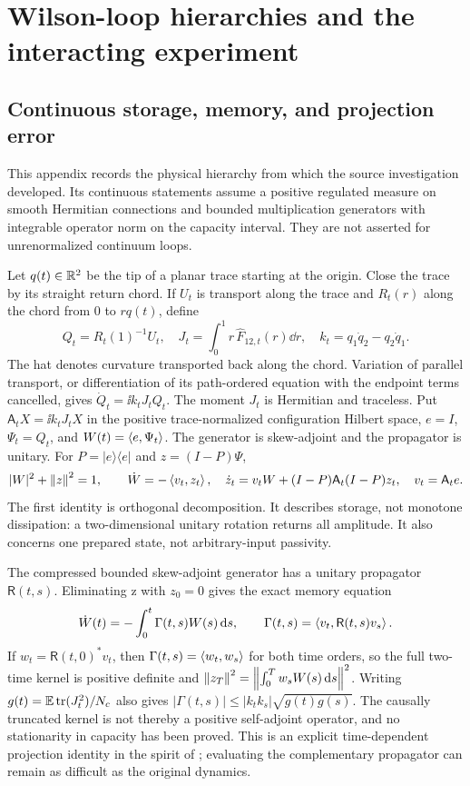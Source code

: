 \section{Wilson-loop hierarchies and the interacting experiment}\label{app:hierarchy}
\subsection{Continuous storage, memory, and projection error}
This appendix records the physical hierarchy from which the
source investigation developed. Its continuous statements
assume a positive regulated measure on smooth Hermitian
connections and bounded multiplication generators with
integrable operator norm on the capacity interval. They are
not asserted for unrenormalized continuum loops.

Let $q(t)\in\mathbb R^2$ be the tip of a planar trace starting at
the origin. Close the trace by its straight return chord.
If $U_t$ is transport along the trace and $R_t(r)$ along
the chord from 0 to $rq(t)$, define
\begin{equation}
Q_t=R_t(1)^{-1}U_t,\quad
J_t=\int_0^1r\,\widehat F_{12,t}(r)\dd r,\quad
k_t=q_1\dot q_2-q_2\dot q_1 .
\end{equation}
The hat denotes curvature transported back along the chord.
Variation of parallel transport, or differentiation of its
path-ordered equation with the endpoint terms cancelled,
gives $\dot Q_t=\ii k_tJ_tQ_t$. The moment $J_t$ is Hermitian
and traceless. Put $\mathsf A_tX=\ii k_tJ_tX$ in the
positive trace-normalized configuration Hilbert space,
$e=I$, $\Psi_t=Q_t$, and $W(t)=\left\langle e,\Psi_t\right\rangle$.
The generator is skew-adjoint and the propagator is unitary.
For $P=|e\rangle\langle e|$ and $z=(I-P)\Psi$,
\begin{equation}
|W|^2+\left\lVert z\right\rVert^2=1,\qquad
\dot W=-\left\langle v_t,z_t\right\rangle,\quad
\dot z_t=v_tW+(I-P)\mathsf A_t(I-P)z_t,\quad v_t=\mathsf A_te .
\end{equation}
The first identity is orthogonal decomposition. It describes
storage, not monotone dissipation: a two-dimensional unitary
rotation returns all amplitude. It also concerns one
prepared state, not arbitrary-input passivity.

The compressed bounded skew-adjoint generator has a unitary
propagator $\mathsf R(t,s)$. Eliminating z with $z_0=0$
gives the exact memory equation
\begin{equation}
\dot W(t)=-\int_0^t\Gamma(t,s)W(s)\,\mathrm d s,\qquad
\Gamma(t,s)=\left\langle v_t,\mathsf R(t,s)v_s\right\rangle.
\end{equation}
If $w_t=\mathsf R(t,0)^*v_t$, then
$\Gamma(t,s)=\left\langle w_t,w_s\right\rangle$ for both time orders, so the
full two-time kernel is positive definite and
$\left\lVert z_T\right\rVert^2=\left\lVert\int_0^Tw_sW(s)\,\mathrm d s\right\rVert^2$.
Writing $g(t)=\mathbb E\operatorname{tr}(J_t^2)/N_c$ also gives
$|\Gamma(t,s)|\le|k_tk_s|\sqrt{g(t)g(s)}$.
The causally truncated kernel is not thereby a positive
self-adjoint operator, and no stationarity in capacity
has been proved. This is an explicit time-dependent
projection identity in the spirit of \cite{mori}; evaluating
the complementary propagator can remain as difficult as
the original dynamics.

